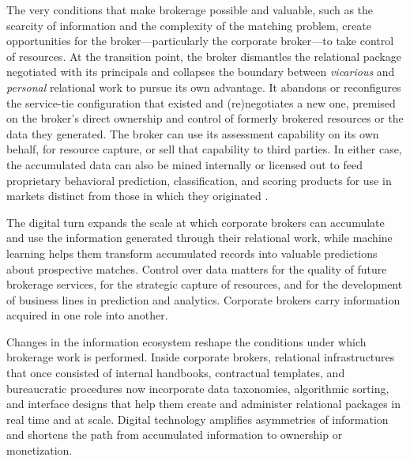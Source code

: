 \documentclass[
]{article}
\begin{document}
The very conditions that make brokerage possible and valuable, such as the scarcity of information and the complexity of the matching problem, create opportunities for the broker---particularly the corporate broker---to take control of resources. At the transition point, the broker dismantles the relational package negotiated with its principals and collapses the boundary between \emph{vicarious} and \emph{personal} relational work to pursue its own advantage. It abandons or reconfigures the service-tie configuration that existed and (re)negotiates a new one, premised on the broker's direct ownership and control of formerly brokered resources or the data they generated. The broker can use its assessment capability on its own behalf, for resource capture, or sell that capability to third parties. In either case, the accumulated data can also be mined internally or licensed out to feed proprietary behavioral prediction, classification, and scoring products \autocite{fourcadeSeeingMarket2017,fourcadeOrdinalSociety2024} for use in markets distinct from those in which they originated \autocite{viljoenRelationalTheoryData2021,zuboffAgeSurveillanceCapitalism2019}.

The digital turn expands the scale at which corporate brokers can accumulate and use the information generated through their relational work, while machine learning helps them transform accumulated records into valuable predictions about prospective matches. Control over data matters for the quality of future brokerage services, for the strategic capture of resources, and for the development of business lines in prediction and analytics. Corporate brokers carry information acquired in one role into another.

Changes in the information ecosystem reshape the conditions under which brokerage work is performed. Inside corporate brokers, relational infrastructures that once consisted of internal handbooks, contractual templates, and bureaucratic procedures now incorporate data taxonomies, algorithmic sorting, and interface designs that help them create and administer relational packages in real time and at scale. Digital technology amplifies asymmetries of information and shortens the path from accumulated information to ownership or monetization.
\end{document}
